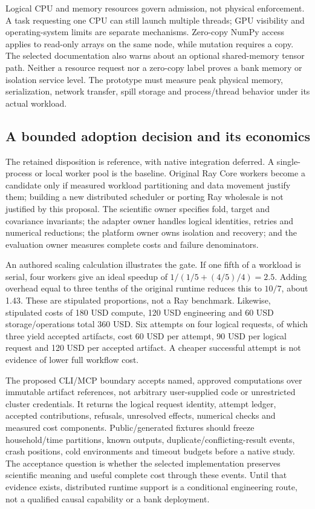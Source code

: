 Logical CPU and memory resources govern admission, not physical enforcement. A task requesting one CPU can still launch multiple threads; GPU visibility and operating-system limits are separate mechanisms. Zero-copy NumPy access applies to read-only arrays on the same node, while mutation requires a copy. The selected documentation also warns about an optional shared-memory tensor path. Neither a resource request nor a zero-copy label proves a bank memory or isolation service level. The prototype must measure peak physical memory, serialization, network transfer, spill storage and process/thread behavior under its actual workload.\citep{exec24_ray_sources}

\subsection{A bounded adoption decision and its economics}
The retained disposition is reference, with native integration deferred. A single-process or local worker pool is the baseline. Original Ray Core workers become a candidate only if measured workload partitioning and data movement justify them; building a new distributed scheduler or porting Ray wholesale is not justified by this proposal. The scientific owner specifies fold, target and covariance invariants; the adapter owner handles logical identities, retries and numerical reductions; the platform owner owns isolation and recovery; and the evaluation owner measures complete costs and failure denominators.\citep{exec24_ray_contract}

An authored scaling calculation illustrates the gate. If one fifth of a workload is serial, four workers give an ideal speedup of $1/(1/5+(4/5)/4)=2.5$. Adding overhead equal to three tenths of the original runtime reduces this to $10/7$, about 1.43. These are stipulated proportions, not a Ray benchmark. Likewise, stipulated costs of 180 USD compute, 120 USD engineering and 60 USD storage/operations total 360 USD. Six attempts on four logical requests, of which three yield accepted artifacts, cost 60 USD per attempt, 90 USD per logical request and 120 USD per accepted artifact. A cheaper successful attempt is not evidence of lower full workflow cost.\citep{exec24_ray_contract}

The proposed CLI/MCP boundary accepts named, approved computations over immutable artifact references, not arbitrary user-supplied code or unrestricted cluster credentials. It returns the logical request identity, attempt ledger, accepted contributions, refusals, unresolved effects, numerical checks and measured cost components. Public/generated fixtures should freeze household/time partitions, known outputs, duplicate/conflicting-result events, crash positions, cold environments and timeout budgets before a native study. The acceptance question is whether the selected implementation preserves scientific meaning and useful complete cost through these events. Until that evidence exists, distributed runtime support is a conditional engineering route, not a qualified causal capability or a bank deployment.\citep{exec24_ray_contract}
